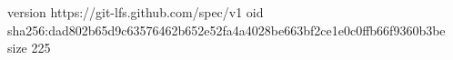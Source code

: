 version https://git-lfs.github.com/spec/v1
oid sha256:dad802b65d9c63576462b652e52fa4a4028be663bf2ce1e0c0ffb66f9360b3be
size 225
